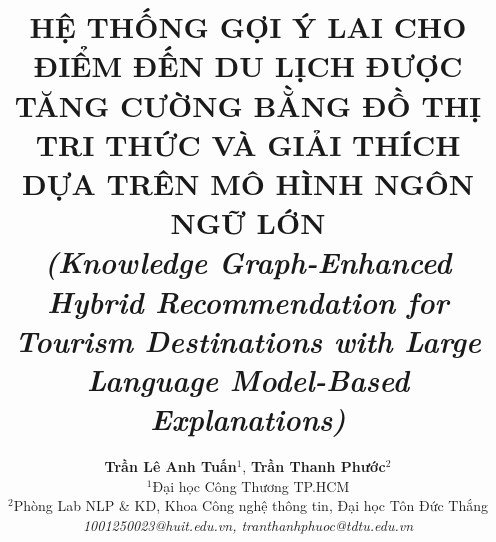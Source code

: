 \documentclass[journal,onecolumn,10pt]{IEEEtran}
\renewcommand{\abstractname}{Tóm tắt}%
\renewcommand\IEEEkeywordsname{Từ khóa}
\begin{document}
\renewcommand{\abstractname}{Tóm tắt}
\renewcommand{\IEEEkeywordsname}{Từ khóa}

\title{
\fontsize{13.5}{17}\selectfont
\bfseries
HỆ THỐNG GỢI Ý LAI CHO ĐIỂM ĐẾN DU LỊCH ĐƯỢC TĂNG CƯỜNG BẰNG ĐỒ THỊ TRI THỨC VÀ GIẢI THÍCH DỰA TRÊN MÔ HÌNH NGÔN NGỮ LỚN\\
\vspace{0.25cm}
\large\normalfont\textit{(Knowledge Graph-Enhanced Hybrid Recommendation for Tourism Destinations with Large Language Model-Based Explanations)}
}

\author{
\vspace{0.15cm}
\textbf{Trần Lê Anh Tuấn}$^{1}$, \textbf{Trần Thanh Phước}$^{2}$\\
\vspace{0.05cm}
$^{1}$Đại học Công Thương TP.HCM\\
$^{2}$Phòng Lab NLP \& KD, Khoa Công nghệ thông tin, Đại học Tôn Đức Thắng\\
\textit{1001250023@huit.edu.vn, tranthanhphuoc@tdtu.edu.vn}
}

\maketitle
\end{document}

